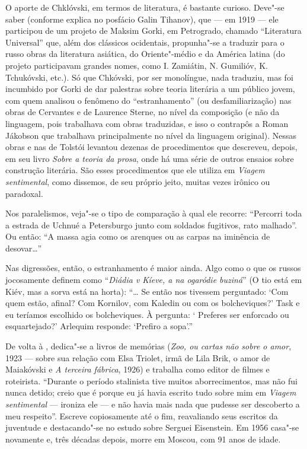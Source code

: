 O aporte de Chklóvski, em termos de literatura, é bastante curioso.
Deve"-se saber (conforme explica no posfácio Galin Tihanov), que --- em
1919 --- ele participou de um projeto de Maksim Gorki, em Petrogrado,
chamado ``Literatura Universal'' que, além dos clássicos ocidentais,
propunha"-se a traduzir para o russo obras da literatura asiática, do
Oriente"-médio e da América latina (do projeto participavam grandes
nomes, como I. Zamiátin, N. Gumilióv, K. Tchukóvski, etc.). Só que
Chkóvski, por ser monolíngue, nada traduziu, mas foi incumbido por Gorki
de dar palestras sobre teoria literária a um público jovem, com quem
analisou o fenômeno do ``estranhamento'' (ou desfamiliarização) nas
obras de Cervantes e de Laurence Sterne, no nível da composição (e não
da linguagem, pois trabalhava com obras traduzidas, e isso o contrapôs a
Roman Jákobson que trabalhava principalmente no nível da linguagem
original). Nessas obras e nas de Tolstói levantou dezenas de
procedimentos que descreveu, depois, em seu livro \emph{Sobre a teoria
da prosa}, onde há uma série de outros ensaios sobre construção
literária. São esses procedimentos que ele utiliza em \emph{Viagem
sentimental}, como dissemos, de seu próprio jeito, muitas vezes irônico
ou paradoxal.

Nos paralelismos, veja"-se o tipo de comparação à qual ele recorre:
``Percorri toda a estrada de Uchnué a Petersburgo junto com soldados
fugitivos, rato malhado''. Ou então: ``A massa agia como os arenques ou
as carpas na iminência de desovar\ldots{}''

Nas digressões, então, o estranhamento é maior ainda. Algo como o que os
russos jocosamente definem como ``\emph{Diádia v Kíeve, a na ogaródie
buziná}'' (O tio está em Kiév, mas a sorva está na horta): ``\ldots{} Se então
nos tivessem perguntado: `Com quem estão, afinal? Com Kornilov, com
Kaledin ou com os bolcheviques?' Task e eu teríamos escolhido os
bolcheviques. À pergunta: ` Preferes ser enforcado ou esquartejado?'
Arlequim responde: `Prefiro a sopa'.''

De volta à , dedica"-se a livros de memórias (\emph{Zoo, ou cartas
não sobre o amor}, 1923 --- sobre sua relação com Elsa Triolet, irmã de
Lila Brik, o amor de Maiakóvski e \emph{A terceira fábrica}, 1926) e
trabalha como editor de filmes e roteirista. ``Durante o período
stalinista tive muitos aborrecimentos, mas não fui nunca detido; creio
que é porque eu já havia escrito tudo sobre mim em \emph{Viagem
sentimental} --- ironiza ele --- e não havia mais nada que pudesse ser
descoberto a meu respeito''. Escreve copiosamente até o fim,
reavaliando seus escritos da juventude e destacando"-se no estudo sobre
Serguei Eisenstein. Em 1956 casa"-se novamente e, três décadas depois,
morre em Moscou, com 91 anos de idade.

